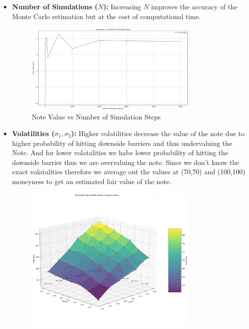 \documentclass[12pt,a4paper]{article}
\begin{document}
\begin{itemize}
    \item \textbf{Number of Simulations (\( N \)):} Increasing \( N \) improves the accuracy of the Monte Carlo estimation but at the cost of computational time.
	\begin{figure}[H]
	    \centering
	    \includegraphics[width=0.8\textwidth, keepaspectratio]{images_project_2/note_val_sim.png}
	    \caption{Note Value vs Number of Simulation Steps}
	    \label{fig:yourlabel}
	\end{figure}
    \item \textbf{Volatilities (\( \sigma_1, \sigma_2 \)):} Higher volatilities decrease the value of the note due to higher probability of hitting downside barriers and thus undervaluing the Note. And for lower volatalities we habe lower probability of hitting the downside barrier thus we are overvaluing the note. Since we don't know the exact volatalities therefore we average out the values at (70,70) and (100,100) moneyness to get an estimated fair value of the note.
	\begin{figure}[H]
	    \centering
	     \includegraphics[width=0.8\textwidth, keepaspectratio]{images_project_2/note_val_sigma.png}

\end{figure}
\end{itemize}
\end{document}
